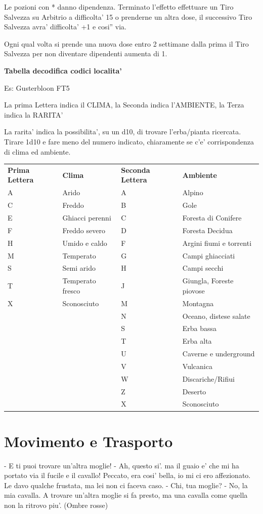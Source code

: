 \documentclass[a4paper,11pt,twoside,openany]{dndbook}
\begin{document}
{Le pozioni con {*} danno dipendenza. Terminato l'effetto effettuare
un Tiro Salvezza su Arbitrio a difficolta' 15 o prenderne un altra
dose, il successivo Tiro Salvezza avra' difficolta' +1 e cosi'' via.

Ogni qual volta si prende una nuova dose entro 2 settimane dalla prima
il Tiro Salvezza per non diventare dipendenti aumenta di 1.

\bigskip

\textbf{Tabella decodifica codici localita'}
\smallskip

Es: Gusterbloon FT5

La prima Lettera indica il CLIMA, la Seconda indica l'AMBIENTE, la
Terza indica la RARITA'

La rarita' indica la possibilita', su un d10, di trovare l'erba/pianta
ricercata. Tirare 1d10 e fare meno del numero indicato, chiaramente
se c'e' corrispondenza di clima ed ambiente.
\bigskip

\begin{tabular}[c]{@{}llll@{}}
\toprule 
\textbf{Prima Lettera} & \textbf{Clima}&\textbf{Seconda Lettera} & \textbf{Ambiente}\tabularnewline
A & Arido & A & Alpino\tabularnewline
C & Freddo&B & Gole\tabularnewline
E & Ghiacci perenni&C & Foresta di Conifere\tabularnewline
F & Freddo severo&D & Foresta Decidua\tabularnewline
H & Umido e caldo&F & Argini fiumi e torrenti\tabularnewline
M & Temperato&G & Campi ghiacciati\tabularnewline
S & Semi arido&H & Campi secchi\tabularnewline
T & Temperato fresco&J & Giungla, Foreste piovose\tabularnewline
X & Sconosciuto&M & Montagna\tabularnewline
&&N & Oceano, distese salate\tabularnewline
&&S & Erba bassa\tabularnewline
&&T & Erba alta\tabularnewline
&&U & Caverne e underground\tabularnewline
&&V & Vulcanica\tabularnewline
&&W & Discariche/Rifiui\tabularnewline
&&Z & Deserto\tabularnewline
&&X & Sconosciuto\tabularnewline
\bottomrule
\end{tabular}

\pagebreak

\section{Movimento e Trasporto}

\label{movimento-e-trasporto}



\begin{quotebox}
- E ti puoi trovare un'altra moglie!\linebreak
- Ah, questo si'. ma il guaio e' che mi ha portato via il fucile e il cavallo! Peccato, era cosi' bella, io mi ci ero affezionato. Le davo qualche frustata, ma lei non ci faceva caso.\linebreak
- Chi, tua moglie?\linebreak
- No, la mia cavalla. A trovare un'altra moglie si fa presto, ma una cavalla come quella non la ritrovo piu'. (Ombre rosse)
\end{quotebox}


}
\end{document}

